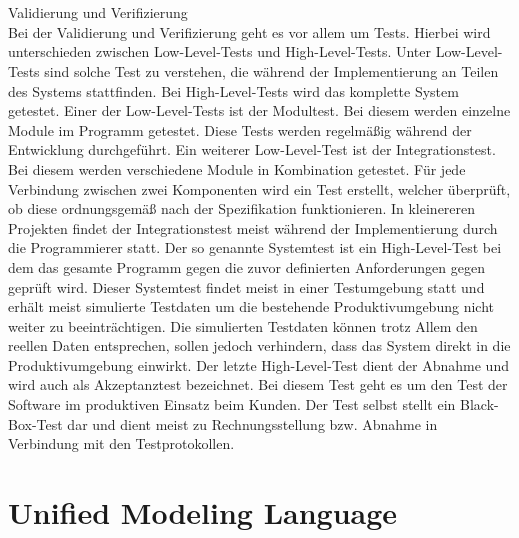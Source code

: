 \\
\\
Validierung und Verifizierung
\\
Bei der Validierung  und Verifizierung geht es vor allem um Tests. Hierbei wird unterschieden zwischen Low-Level-Tests und High-Level-Tests. Unter Low-Level-Tests sind solche Test zu verstehen, die während der Implementierung an Teilen des Systems stattfinden. Bei High-Level-Tests wird das komplette System getestet. Einer der Low-Level-Tests ist der Modultest. Bei diesem werden einzelne Module im Programm getestet.  Diese Tests werden regelmäßig während der Entwicklung durchgeführt. Ein weiterer Low-Level-Test ist der Integrationstest. Bei diesem werden verschiedene Module in Kombination getestet. Für jede Verbindung zwischen zwei Komponenten wird ein Test erstellt, welcher überprüft, ob diese ordnungsgemäß nach der Spezifikation funktionieren. In kleinereren Projekten findet der Integrationstest meist während der Implementierung durch die Programmierer statt.
Der so genannte Systemtest ist ein High-Level-Test bei dem das gesamte Programm gegen die zuvor definierten Anforderungen gegen geprüft wird. Dieser Systemtest findet meist in einer Testumgebung statt und erhält meist simulierte Testdaten um die bestehende Produktivumgebung nicht weiter zu beeinträchtigen. Die simulierten Testdaten können trotz Allem den reellen Daten entsprechen, sollen jedoch verhindern, dass das System direkt in die Produktivumgebung einwirkt.
Der letzte High-Level-Test dient der Abnahme und wird auch als Akzeptanztest bezeichnet. Bei diesem Test geht es um den Test der Software im produktiven Einsatz beim Kunden. Der Test selbst stellt ein Black-Box-Test dar und dient meist zu Rechnungsstellung bzw. Abnahme in Verbindung mit den Testprotokollen.

\section{Unified Modeling Language}
\label{sec:uml}

